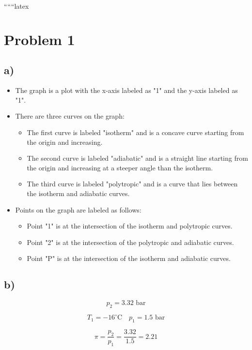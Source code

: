 
``````latex


\section*{Problem 1}

\subsection*{a)}

\begin{itemize}
    \item The graph is a plot with the x-axis labeled as "1" and the y-axis labeled as "1".
    \item There are three curves on the graph:
        \begin{itemize}
            \item The first curve is labeled "isotherm" and is a concave curve starting from the origin and increasing.
            \item The second curve is labeled "adiabatic" and is a straight line starting from the origin and increasing at a steeper angle than the isotherm.
            \item The third curve is labeled "polytropic" and is a curve that lies between the isotherm and adiabatic curves.
        \end{itemize}
    \item Points on the graph are labeled as follows:
        \begin{itemize}
            \item Point "1" is at the intersection of the isotherm and polytropic curves.
            \item Point "2" is at the intersection of the polytropic and adiabatic curves.
            \item Point "P" is at the intersection of the isotherm and adiabatic curves.
        \end{itemize}
\end{itemize}

\subsection*{b)}

\[
p_2 = 3.32 \text{ bar}
\]

\[
T_1 = -16^\circ \text{C} \quad p_1 = 1.5 \text{ bar}
\]

\[
\pi = \frac{p_2}{p_1} = \frac{3.32}{1.5} = 2.21
\]

